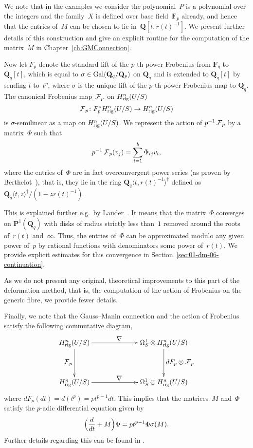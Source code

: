 We note that in the examples we consider the polynomial~$P$ is a polynomial 
over the integers and the family~$X$ is defined over base field~$\mathbf{F}_p$ 
already, and hence that the entries of~$M$ can be chosen to lie 
in~$\mathbf{Q}[t,r(t)^{-1}]$.  We present further details of this construction 
and give an explicit routine for the computation of the matrix~$M$ 
in Chapter~\ref{ch:GMConnection}.

Now let $F_p$ denote the standard lift of the $p$-th power Frobenius 
from $\mathbf{F}_q$ to $\mathbf{Q}_q[t]$, which is equal to 
$\sigma \in \operatorname{Gal}(\mathbf{Q}_q/\mathbf{Q}_p)$ on $\mathbf{Q}_q$ and 
is extended to $\mathbf{Q}_q[t]$ by sending $t$ to~$t^p$, where $\sigma$ 
is the unique lift of the $p$-th power Frobenius map to $\mathbf{Q}_q$.  
The canonical Frobenius map~$\operatorname{\mathcal{F}}_p$ on $H_{\text{rig}}^{n}(U/S)$
\begin{equation*}
\operatorname{\mathcal{F}}_p \colon F_p^{*} H_{\text{rig}}^{n}(U/S) \rightarrow H_{\text{rig}}^{n}(U/S)
\end{equation*}
is $\sigma$-semilinear as a map on $H_{\text{rig}}^{n}(U/S)$.  We represent 
the action of $p^{-1} \operatorname{\mathcal{F}}_p$ by a matrix~$\Phi$ such that 
\begin{equation*}
p^{-1} \operatorname{\mathcal{F}}_p (v_j) = \sum_{i=1}^{b} \Phi_{ij} v_i,
\end{equation*}
where the entries of~$\Phi$ are in fact overconvergent power series 
(as proven by Berthelot~\citep[Th\'eor\`eme~5]{Berthelot1986}), 
that is, they lie in the ring $\mathbf{Q}_q\langle t, r(t)^{-1}\rangle^{\dagger}$ 
defined as $\mathbf{Q}_q \langle t, z \rangle^{\dagger} / (1 - z r(t)^{-1})$.

This is explained further e.g.\ by Lauder~\citep[\S 3.5]{Lauder2006}.  
It means that the matrix~$\Phi$ converges on $\mathbf{P}^{1}(\mathbf{Q}_q)$ 
with disks of radius strictly less than~$1$ removed around the roots of~$r(t)$ 
and~$\infty$.  Thus, the entries of~$\Phi$ can be approximated modulo 
any given power of~$p$ by rational functions with denominators some 
power of~$r(t)$.  We provide explicit estimates for this convergence 
in Section~\ref{sec:01-dm-06-continuation}.

As we do not present any original, theoretical improvements to this part of 
the deformation method, that is, the computation of the action of Frobenius 
on the generic fibre, we provide fewer details.

Finally, we note that the Gauss--Manin connection and the action of 
Frobenius satisfy the following commutative diagram,
\begin{equation*}
\def\labelstyle{\textstyle}
\xymatrix@C=6.8em@R=4em{
\Hrig^{n}(U/S) \ar[d]_{\Frob_p} \ar[r]^{\nabla} & 
\Omega_{S}^{1} \otimes \Hrig^{n}(U/S) \ar[d]^{d F_p \otimes \Frob_p} \\
\Hrig^{n}(U/S) \ar[r]^{\nabla} & 
\Omega_{S}^{1} \otimes \Hrig^{n}(U/S) 
}
\end{equation*}
where $d F_p (dt) = d(t^p) = p t^{p-1} dt$.  This implies that the 
matrices~$M$ and~$\Phi$ satisfy the $p$-adic differential equation given by 
\begin{equation*}
\Bigl( \frac{d}{dt} + M \Bigr) \Phi = p t^{p-1} \Phi \sigma(M).
\end{equation*}
Further details regarding this can be found in \citep[\S 5]{Gerkmann2007}.

